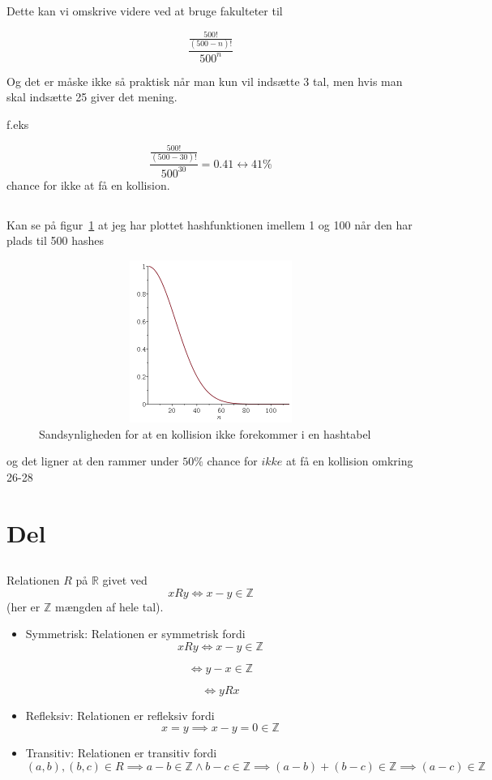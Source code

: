 \documentclass[12pt, a4paper, hidelinks]{article}
\newcommand{\ZZ}{\mathbb{Z}}
\newcommand{\RR}{\mathbb{R}}
\begin{document}
Dette kan vi omskrive videre ved at bruge fakulteter til

$$ \frac{\frac{500!}{(500-n)!}}{500^n} $$

Og det er måske ikke så praktisk når man kun vil indsætte 3 tal, men hvis man skal indsætte 25 giver det mening.

f.eks 

$$ \frac{\frac{500!}{(500-30)!}}{500^{30}} = 0.41 \leftrightarrow 41\% $$ 
chance for ikke at få en kollision.


\subsection{}

Kan se på figur~\ref{fig:probability} at jeg har plottet hashfunktionen imellem 1 og 100 når den har plads til 500 hashes

\begin{figure}[htb!]
    \includegraphics[width=500px, height=200px]{probability.png}
    \centering
    \caption{Sandsynligheden for at en kollision ikke forekommer i en hashtabel}
    \label{fig:probability}
\end{figure}

og det ligner at den rammer under $ 50\% $ chance for $ ikke $ at få en kollision omkring 26-28

\section{Del}

\subsection{}

Relationen $R$ på $\RR$ givet ved
\[
x R y \Longleftrightarrow x-y\in\ZZ
\]
(her er $\ZZ$ mængden af hele tal).

\begin{itemize}
\item{Symmetrisk:} 
Relationen er symmetrisk fordi
\[
xRy \Longleftrightarrow x-y\in\ZZ
\]

\[
 \Longleftrightarrow y-x\in\ZZ
\]

\[
 \Longleftrightarrow yRx
\]
\item{Refleksiv:}
Relationen er refleksiv fordi $$ x=y \implies x-y=0 \in \ZZ $$
\item{Transitiv:}
Relationen er transitiv fordi
$$ (a, b), (b,c) \in R \implies a-b \in \ZZ \land b-c \in \ZZ \implies (a-b)+(b-c) \in \ZZ \implies (a-c) \in \ZZ   $$
\end{itemize}
\end{document}

